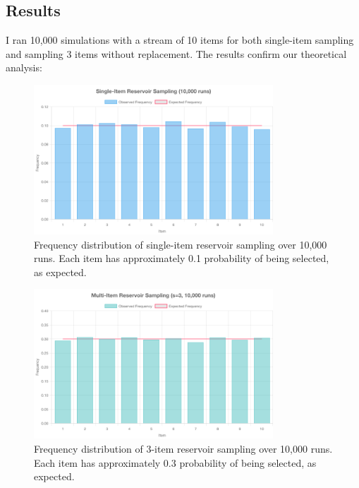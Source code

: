 \documentclass{article}
\begin{document}
\subsection{Results}

I ran 10,000 simulations with a stream of 10 items for both single-item sampling and sampling 3 items without replacement. The results confirm our theoretical analysis:

\begin{figure}[h]
    \centering
    \includegraphics[width=0.8\textwidth]{images/single_item_sampling.png}
    \caption{Frequency distribution of single-item reservoir sampling over 10,000 runs. Each item has approximately 0.1 probability of being selected, as expected.}
    \label{fig:single-item-sampling}
\end{figure}

\begin{figure}[H]
    \centering
    \includegraphics[width=0.8\textwidth]{images/multi_item_sampling.png}
    \caption{Frequency distribution of 3-item reservoir sampling over 10,000 runs. Each item has approximately 0.3 probability of being selected, as expected.}
    \label{fig:multi-item-sampling}
\end{figure}
\end{document}
